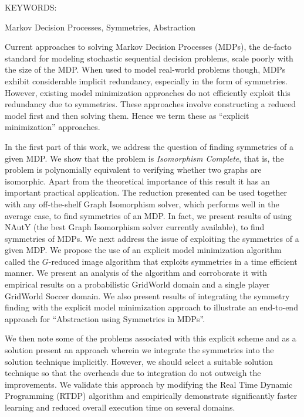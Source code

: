 \documentclass[MTech]{iitmdiss}
\begin{document}
\abstract

\noindent KEYWORDS: \hspace*{0.5em} \parbox[t]{4.4in}{Markov Decision Processes,
Symmetries, Abstraction}

\vspace*{24pt}

Current approaches to solving Markov Decision Processes (MDPs), the de-facto
standard for modeling stochastic sequential decision problems, scale poorly
with the size of the MDP. When used to model real-world problems though,
MDPs exhibit considerable implicit redundancy, especially in the form of
symmetries.  However, existing model minimization approaches do not
efficiently exploit this redundancy due to symmetries. These approaches
involve constructing a reduced model first and then solving them. Hence we
term these as ``explicit minimization'' approaches.

In the first part of this work, we address the question of finding
symmetries of a given MDP. We show that the problem is \emph{Isomorphism
Complete}, that is, the problem is polynomially equivalent to verifying
whether two graphs are isomorphic. Apart from the theoretical importance of
this result it has an important practical application. The reduction
presented can be used together with any off-the-shelf Graph Isomorphism
solver, which performs well in the average case, to find symmetries of an
MDP. In fact, we present results of using NAutY (the best Graph Isomorphism
solver currently available), to find symmetries of MDPs. We next address the
issue of exploiting the symmetries of a given MDP. We propose the use of an
explicit model minimization algorithm called the $G$-reduced image
algorithm that exploits symmetries in a time efficient manner. We present an
analysis of the algorithm and corroborate it with empirical results on a
probabilistic GridWorld domain and a single player GridWorld Soccer domain.
We also present results of integrating the symmetry finding with the
explicit model minimization approach to illustrate an end-to-end approach
for ``Abstraction using Symmetries in MDPs''.

We then note some of the problems associated with this explicit scheme and
as a solution present an approach wherein we integrate the symmetries into
the solution technique implicitly. However, we should select a suitable
solution technique so that the overheads due to integration do not outweigh
the improvements. We validate this approach by modifying the Real Time
Dynamic Programming (RTDP) algorithm and empirically demonstrate
significantly faster learning and reduced overall execution time on several
domains.
\end{document}
